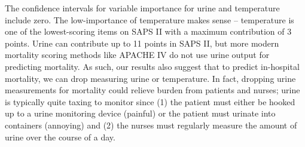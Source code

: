 \documentclass{article}
\begin{document}
The confidence intervals for variable importance for urine and temperature include zero.
The low-importance of temperature makes sense -- temperature is one of the lowest-scoring items on SAPS II with a maximum contribution of 3 points.
Urine can contribute up to 11 points in SAPS II, but more modern mortality scoring methods like APACHE IV \citep{zimmerman2006acute} do not use urine output for predicting mortality.
As such, our results also suggest that to predict in-hospital mortality, we can drop measuring urine or temperature.
In fact, dropping urine measurements for mortality could relieve burden from patients and nurses; urine is typically quite taxing to monitor since (1) the patient must either be hooked up to a urine monitoring device (painful) or the patient must urinate into containers (annoying) and (2) the nurses must regularly measure the amount of urine over the course of a day.




\end{document}

